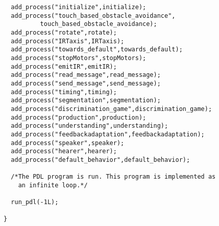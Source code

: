 \begin{lstlisting}
  add_process("initialize",initialize);
  add_process("touch_based_obstacle_avoidance",
	      touch_based_obstacle_avoidance);
  add_process("rotate",rotate);
  add_process("IRTaxis",IRTaxis);
  add_process("towards_default",towards_default);
  add_process("stopMotors",stopMotors);
  add_process("emitIR",emitIR);
  add_process("read_message",read_message);
  add_process("send_message",send_message);
  add_process("timing",timing);
  add_process("segmentation",segmentation);
  add_process("discrimination_game",discrimination_game);
  add_process("production",production);
  add_process("understanding",understanding);
  add_process("feedbackadaptation",feedbackadaptation);
  add_process("speaker",speaker);
  add_process("hearer",hearer);
  add_process("default_behavior",default_behavior);

  /*The PDL program is run. This program is implemented as
    an infinite loop.*/

  run_pdl(-1L);

}
\end{lstlisting}
